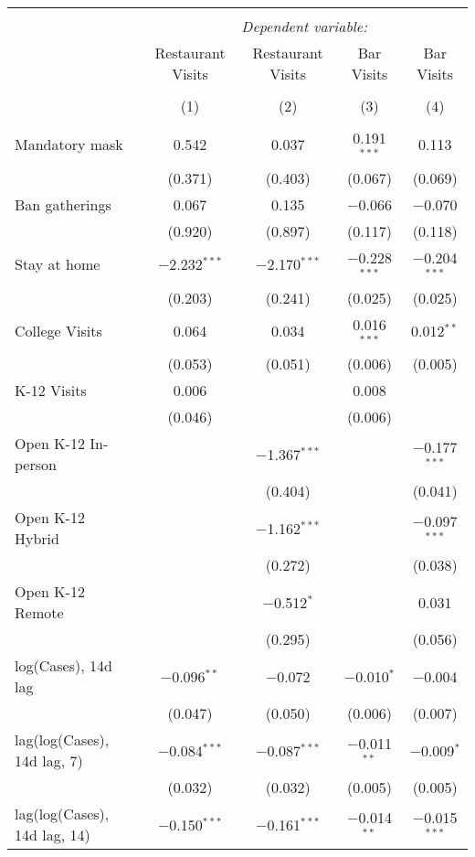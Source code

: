 \begin{tabular}{@{\extracolsep{1pt}}lcccc} 
\\[-1.8ex]\hline 
\hline \\[-1.8ex] 
 & \multicolumn{4}{c}{\textit{Dependent variable:}} \\ 
\cline{2-5} 
 & Restaurant Visits & Restaurant Visits & Bar Visits & Bar Visits \\ 
\\[-1.8ex] & (1) & (2) & (3) & (4)\\ 
\hline \\[-1.8ex] 
 Mandatory mask & 0.542 & 0.037 & 0.191$^{***}$ & 0.113 \\ 
  & (0.371) & (0.403) & (0.067) & (0.069) \\ 
  Ban gatherings & 0.067 & 0.135 & $-$0.066 & $-$0.070 \\ 
  & (0.920) & (0.897) & (0.117) & (0.118) \\ 
  Stay at home & $-$2.232$^{***}$ & $-$2.170$^{***}$ & $-$0.228$^{***}$ & $-$0.204$^{***}$ \\ 
  & (0.203) & (0.241) & (0.025) & (0.025) \\ 
  College Visits & 0.064 & 0.034 & 0.016$^{***}$ & 0.012$^{**}$ \\ 
  & (0.053) & (0.051) & (0.006) & (0.005) \\ 
  K-12 Visits & 0.006 &  & 0.008 &  \\ 
  & (0.046) &  & (0.006) &  \\ 
  Open K-12 In-person &  & $-$1.367$^{***}$ &  & $-$0.177$^{***}$ \\ 
  &  & (0.404) &  & (0.041) \\ 
  Open K-12 Hybrid &  & $-$1.162$^{***}$ &  & $-$0.097$^{***}$ \\ 
  &  & (0.272) &  & (0.038) \\ 
  Open K-12 Remote &  & $-$0.512$^{*}$ &  & 0.031 \\ 
  &  & (0.295) &  & (0.056) \\ 
  log(Cases), 14d lag & $-$0.096$^{**}$ & $-$0.072 & $-$0.010$^{*}$ & $-$0.004 \\ 
  & (0.047) & (0.050) & (0.006) & (0.007) \\ 
  lag(log(Cases), 14d lag, 7) & $-$0.084$^{***}$ & $-$0.087$^{***}$ & $-$0.011$^{**}$ & $-$0.009$^{*}$ \\ 
  & (0.032) & (0.032) & (0.005) & (0.005) \\ 
  lag(log(Cases), 14d lag, 14) & $-$0.150$^{***}$ & $-$0.161$^{***}$ & $-$0.014$^{**}$ & $-$0.015$^{***}$ \\ 

\end{tabular}
